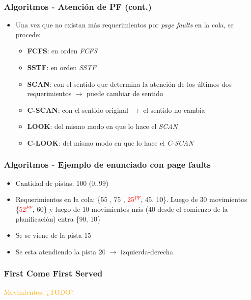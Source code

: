 \begin{frame}
  \frametitle{Algoritmos - Atención de \textbf{PF (cont.)}}
  \begin{itemize}
    \item Una vez que no existan más requerimientos por \textit{page faults} en la cola, se procede:
    \begin{itemize}
      \item \textbf{FCFS}: en orden \textit{FCFS}
      \item \textbf{SSTF}: en orden \textit{SSTF}
      \item \textbf{SCAN}: con el sentido que determina la atención de los últimos dos requerimientos $\rightarrow$ puede cambiar de sentido
      \item \textbf{C-SCAN}: con el sentido original $\rightarrow$ el sentido no cambia
      \item \textbf{LOOK}: del mismo modo en que lo hace el \textit{SCAN}
      \item \textbf{C-LOOK}: del mismo modo en que lo hace el \textit{C-SCAN}
    \end{itemize}
  \end{itemize}
\end{frame}

\begin{frame}
  \frametitle{Algoritmos - Ejemplo de enunciado con \textbf{page faults}}
  \begin{itemize}
    \item Cantidad de pistas: 100 (0..99)
    \item Requerimientos en la cola: \{55 , 75 , \textcolor{red}{25$^{PF}$}, 45, 10\}. Luego de 30 movimientos \{\textcolor{red}{52$^{PF}$}, 60\} y luego de 10 movimientos más (40 desde el comienzo de la planificación) entra \{90, 10\}
    \item Se se viene de la pista 15
    \item Se esta atendiendo la pista 20 $\rightarrow$ izquierda-derecha
  \end{itemize}
\end{frame}

\begin{frame}
  \frametitle{\textbf{First Come First Served}}
  \hspace{35pt} \textcolor{orange}{Movimientos: ¿TODO?}
\end{frame}

